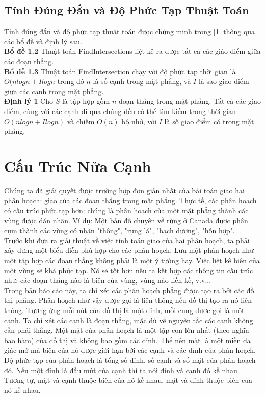 \documentclass[15pt]{article}
\begin{document}
\subsection{Tính Đúng Đắn và Độ Phức Tạp Thuật Toán}
Tính đúng đắn và độ phức tạp thuật toán được chứng minh trong [1] thông qua các bổ đề và định lý sau.\\

\textbf{Bổ đề 1.2} Thuật toán FindIntersections liệt kê ra được tất cả các giáo điểm giữa các đoạn thẳng. \\

\textbf{Bổ đề 1.3} Thuật toán FindIntersection chạy với độ phức tạp thời gian là $O(n log n + I log n$ trong đó $n$ là số cạnh trong mặt phẳng, và $I$ là sao giao điểm giữa các cạnh trong mặt phẳng. \\

\textbf{Định lý 1} Cho $S$ là tập hợp gồm $n$ đoạn thẳng trong mặt phẳng. Tất cả các giao điểm, cùng với các cạnh đi qua chúng đều có thể tìm kiếm trong thời gian $O(n log n + I log n)$ và chiếm $O(n)$ bộ nhớ, với $I$ là số giao điểm có trong mặt phẳng.


\section{Cấu Trúc Nửa Cạnh}
Chúng ta đã giải quyết được trường hợp đơn giản nhất của bài toán giao hai phân hoạch: giao của các đoạn thẳng trong mặt phẳng. Thực tế, các phân hoạch có cấu trúc phức tạp hơn: chúng là phân hoạch của một mặt phẳng thành các vùng được dán nhãn. Ví dụ: Một bản đồ chuyên về rừng ở Canada được phân cụm thành các vùng có nhãn "thông", "rụng lá", "bạch dương", "hỗn hợp".\\

Trước khi đưa ra giải thuật về việc tính toán giao của hai phân hoạch, ta phải xây dựng một biểu diễn phù hợp cho các phân hoạch. Lưu một phân hoạch như một tập hợp các đoạn thẳng không phải là một ý tưởng hay. Việc liệt kê biên của một vùng sẽ khá phức tạp. Nó sẽ tốt hơn nếu ta kết hợp các thông tin cấu trúc như: các đoạn thẳng nào là biên của vùng, vùng nào liền kề, v.v...\\

Trong bản báo cáo này, ta chỉ xét các phân hoạch phẳng được tạo ra bởi các đồ thị phẳng. Phân hoạch như vậy được gọi là liên thông nếu đồ thị tạo ra nó liên thông. Tương ứng mỗi nút của đồ thị là một đỉnh, mỗi cung được gọi là một cạnh. Ta chỉ xét các cạnh là đoạn thẳng, mặc dù về nguyên tắc các cạnh không cần phải thẳng. Một mặt của phân hoạch là một tập con lớn nhất (theo nghĩa bao hàm) của đồ thị và không bao gồm các đỉnh. Thế nên mặt là một miền đa giác mở mà biên của nó được giới hạn bởi các cạnh và các đỉnh của phân hoạch. Độ phức tạp của phân hoạch là tổng số đỉnh, số cạnh và số mặt của phân hoạch đó. Nếu một đỉnh là đầu mút của cạnh thì ta nói đỉnh và cạnh đó kề nhau. Tương tự, mặt và cạnh thuộc biên của nó kề nhau, mặt và đỉnh thuộc biên của nó kề nhau. \\
\end{document}
